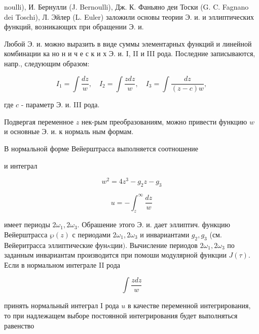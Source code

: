 \documentclass[10pt]{article}
\begin{document}
noulli), И. Бернулли (J. Bernoulli), Дж. К. Фаньяно деи Тоски (G. C. Fagnano dei Toschi), Л. Эйлер (L. Euler) заложили основы теории Э. и. и эллиптических функций, возникающих при обращении Э. и.



Любой Э. и. можно выразить в виде суммы элементарных функций и линейной комбинации ка но н и ч е с к и х Э. и. I, II и III рода. Последние записываются, напр., следующим образом:



\[

I_{1}=\int \frac{d z}{w}, \quad I_{2}=\int \frac{z d z}{w}, \quad I_{3}=\int \frac{d z}{(z-c) w},

\]



где $c$ - параметр Э. и. III рода.



Подвергая переменное $z$ нек-рым преобразованиям, можно привести функцию $w$ и основные Э. и. к нормаль ным формам.



В нормальной форме Вейерштрасса выполняется соотношение



и интеграл



\[

w^{2}=4 z^{3}-g_{2} z-g_{3}

\]



\[

u=-\int_{z}^{\infty} \frac{d z}{w}

\]



имеет периоды $2 \omega_{1}, 2 \omega_{3}$. Обрашение этого Э. и. дает эллиптич. функцию Вейерштрасса $\wp(z)$ с периодами $2 \omega_{1}, 2 \omega_{3}$ и инвариантами $g_{2}, g_{3}$ (см. Вейеритрасса эллиптические фун$\kappa ц и и)$. Вычисление периодов $2 \omega_{1}, 2 \omega_{3}$ по заданным инвариантам производится при помоши модулярной функции $J(\tau)$. Если в нормальном интеграле II рода



\[

\int \frac{z d z}{w}

\]



принять нормальный интеграл I рода $u$ в качестве переменной интегрирования, то при надлежащем выборе постоянной интегрирования будет выполняться равенство
\end{document}
